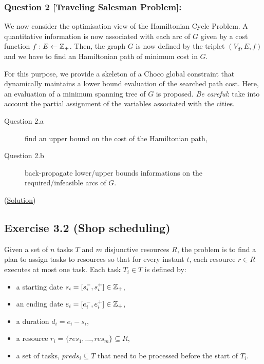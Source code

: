 \subsubsection{Question 2 [Traveling Salesman Problem]:} We now consider the optimisation view of the Hamiltonian Cycle Problem. A quantitative information is now associated with each arc of $G$ given by a cost function $f: E \leftarrow\mathbb{Z}_+$. Then, the graph $G$ is now defined by the triplet $(V_d,E,f)$ and we have to find an Hamiltonian path of minimum cost in $G$. 

For this purpose, we provide a skeleton of a Choco global constraint that dynamically maintains a lower bound evaluation of the searched path cost. Here, an evaluation of a minimum spanning tree of $G$ is proposed. \emph{Be careful}: take into account the partial assignment of the variables associated with the cities. 

\begin{description}
	\item[Question 2.a] find an upper bound on the cost of the Hamiltonian path,
	\item[Question 2.b] back-propagate lower/upper bounds informations on the required/infeasible arcs of $G$.
\end{description}

(\hyperlink{solutions:solutionofexercise3.1}{Solution})

\subsection{Exercise 3.2 (Shop scheduling)}\label{exercises:exercise3.2}\hypertarget{exercises:exercise3.2}{}

Given a set of $n$ tasks $T$ and $m$ disjunctive resources $R$, the problem is to find a plan to assign tasks to resources so that for every instant $t$, each resource $r\in R$ executes at most one task. Each task $T_i\in T$ is defined by:
\begin{itemize}
	\item a starting date $s_i = [s^-_i, s^+_i]\in\mathbb{Z}_+$,
	\item an ending date  $e_i = [e^-_i, e^+_i]\in\mathbb{Z}_+$,
	\item a duration  $d_i = e_i-s_i$, %
	\item a resource $r_i = \{res_{1},\ldots, res_{m}\}\subseteq R$,
	\item a set of tasks, $preds_i\subseteq T$ that need to be processed before the start of $T_i$.
\end{itemize}

